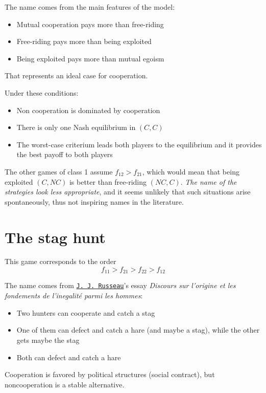 The name comes from the main features of the model:
\begin{itemize}
	\item Mutual cooperation pays more than free-riding
	
	\item Free-riding pays more than being exploited
	
	\item Being exploited pays more than mutual egoism
\end{itemize}
That represents an ideal case for cooperation.

Under these conditions: 
\begin{itemize}
	\item Non cooperation is dominated by cooperation
	
	\item There is only one Nash equilibrium in $(C,C)$
	
	\item The worst-case criterium leads both players to the equilibrium and it provides the best payoff to both players
\end{itemize}

The other games of class 1 assume $f_{12} > f_{21}$, which would mean that being exploited $(C, NC)$ is better than free-riding $(NC, C)$. \textit{The name of the strategies look less appropriate}, and it seems unlikely that such situations arise spontaneously, thus not inspiring names in the literature.

\section{The stag hunt}

This game corresponds to the order
$$ f_{11} > f_{21} > f_{22} > f_{12} $$

The name comes from \href{https://en.wikipedia.org/wiki/Jean-Jacques_Rousseau}{\texttt{J. J. Russeau}}'s essay \textit{Discours sur l'origine et les fondements de l'inegalité parmi les hommes}: 
\begin{itemize}
	\item Two hunters can cooperate and catch a stag
	
	\item One of them can defect and catch a hare (and maybe a stag), while the other gets maybe the stag
	
	\item Both can defect and catch a hare
\end{itemize}
Cooperation is favored by political structures (social contract), but noncooperation is a stable alternative.


